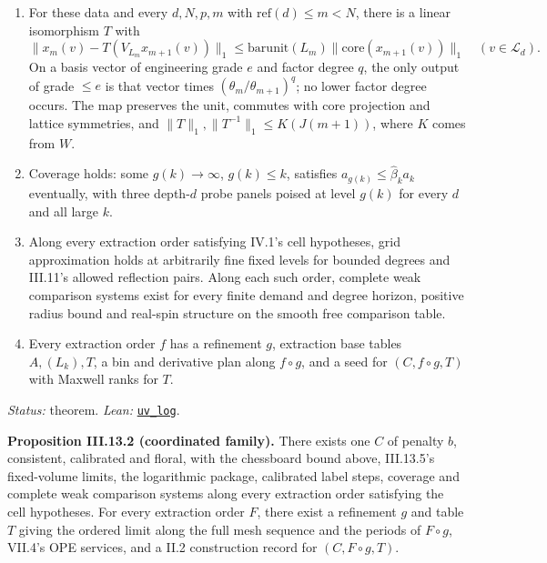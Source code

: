 \documentclass[
  letterpaper,
  11pt]{article}
\begin{document}
\begin{enumerate}
  \(r\to\infty\), and the support exponent is \(100\).
\item
  For these data and every \(d,N,p,m\) with \(\mathrm{ref}(d)\le m<N\),
  there is a linear isomorphism \(T\) with
  \[\|x_m(v)-T(V_{L_m}x_{m+1}(v))\|_1\le\mathrm{barunit}(L_m)\|\mathrm{core}(x_{m+1}(v))\|_1\quad(v\in\mathcal L_d).\]
  On a basis vector of engineering grade \(e\) and factor degree \(q\),
  the only output of grade \(\le e\) is that vector times
  \((\theta_m/\theta_{m+1})^q\); no lower factor degree occurs. The map
  preserves the unit, commutes with core projection and lattice
  symmetries, and \(\|T\|_1,\|T^{-1}\|_1\le K(J(m+1))\), where \(K\)
  comes from \(W\).
\item
  Coverage holds: some \(g(k)\to\infty\), \(g(k)\le k\), satisfies
  \(a_{g(k)}\le\hat\beta_ka_k\) eventually, with three depth-\(d\) probe
  panels poised at level \(g(k)\) for every \(d\) and all large \(k\).
\item
  Along every extraction order satisfying IV.1's cell hypotheses, grid
  approximation holds at arbitrarily fine fixed levels for bounded
  degrees and III.11's allowed reflection pairs. Along each such order,
  complete weak comparison systems exist for every finite demand and
  degree horizon, positive radius bound and real-spin structure on the
  smooth free comparison table.
\item
  Every extraction order \(f\) has a refinement \(g\), extraction base
  tables \(A,(L_k),T\), a bin and derivative plan along \(f\circ g\),
  and a seed for \((C,f\circ g,T)\) with Maxwell ranks for \(T\).
\end{enumerate}

\emph{Status:} theorem. \emph{Lean:}
\href{https://github.com/yang-mills-group/OpenAI-YM-20261028/blob/3456e5e75cf8d4cd558955a5c7638fba2d68f464/YM/SharpGram/Assembly/Flowers.lean\#L75-L130}{\texttt{uv\_log}}.

\textbf{Proposition III.13.2 (coordinated family).} There exists one
\(C\) of penalty \(b\), consistent, calibrated and floral, with the
chessboard bound above, III.13.5's fixed-volume limits, the logarithmic
package, calibrated label steps, coverage and complete weak comparison
systems along every extraction order satisfying the cell hypotheses. For
every extraction order \(F\), there exist a refinement \(g\) and table
\(T\) giving the ordered limit along the full mesh sequence and the
periods of \(F\circ g\), VII.4's OPE services, and a II.2 construction
record for \((C,F\circ g,T)\).
\end{document}
